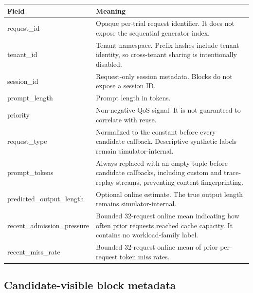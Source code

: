 \documentclass[11pt]{article}
\newcommand{\code}[1]{\texttt{\detokenize{#1}}}
\begin{document}
\begin{tabularx}{\textwidth}{>{\ttfamily}p{} X}
\toprule
\normalfont\textbf{Field} & \textbf{Meaning} \\
\midrule
request\_id & Opaque per-trial request identifier.  It does not expose the sequential
generator index. \\
tenant\_id & Tenant namespace.  Prefix hashes include tenant identity, so cross-tenant
sharing is intentionally disabled. \\
session\_id & Request-only session metadata.  Blocks do not expose a session ID. \\
prompt\_length & Prompt length in tokens. \\
priority & Non-negative QoS signal.  It is not guaranteed to correlate with reuse. \\
request\_type & Normalized to the constant \code{request} before every candidate
callback.  Descriptive synthetic labels remain simulator-internal. \\
prompt\_tokens & Always replaced with an empty tuple before candidate callbacks,
including custom and trace-replay streams, preventing content fingerprinting. \\
predicted\_output\_length & Optional online estimate.  The true output length remains
simulator-internal. \\
recent\_admission\_pressure & Bounded 32-request online mean indicating how often prior
requests reached cache capacity.  It contains no workload-family label. \\
recent\_miss\_rate & Bounded 32-request online mean of prior per-request token miss
rates. \\
\bottomrule
\end{tabularx}

\subsection{Candidate-visible block metadata}
\end{document}
